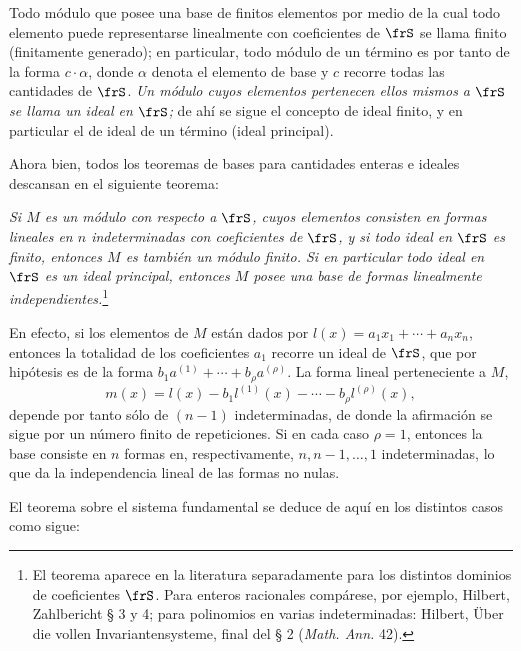 \documentclass[11pt]{article}
\begin{document}
Todo módulo que posee una base de finitos elementos por medio de la cual todo elemento puede representarse linealmente con coeficientes de \(\frS\) se llama finito (finitamente generado); en particular, todo módulo de un término es por tanto de la forma \(c\cdot\alpha\), donde \(\alpha\) denota el elemento de base y \(c\) recorre todas las cantidades de \(\frS\). \emph{Un módulo cuyos elementos pertenecen ellos mismos a \(\frS\) se llama un ideal en \(\frS\);} de ahí se sigue el concepto de ideal finito, y en particular el de ideal de un término (ideal principal).

Ahora bien, todos los teoremas de bases para cantidades enteras e ideales descansan en el siguiente teorema:

\emph{Si \(M\) es un módulo con respecto a \(\frS\), cuyos elementos consisten en formas lineales en \(n\) indeterminadas con coeficientes de \(\frS\), y si todo ideal en \(\frS\) es finito, entonces \(M\) es también un módulo finito. Si en particular todo ideal en \(\frS\) es un ideal principal, entonces \(M\) posee una base de formas linealmente independientes.}\footnote{El teorema aparece en la literatura separadamente para los distintos dominios de coeficientes \(\frS\). Para enteros racionales compárese, por ejemplo, Hilbert, Zahlbericht § 3 y 4; para polinomios en varias indeterminadas: Hilbert, Über die vollen Invariantensysteme, final del § 2 (\emph{Math. Ann.} 42).}

En efecto, si los elementos de \(M\) están dados por \(l(x)=a_1x_1+\cdots+a_nx_n\), entonces la totalidad de los coeficientes \(a_1\) recorre un ideal de \(\frS\), que por hipótesis es de la forma \(b_1a^{(1)}+\cdots+b_\rho a^{(\rho)}\). La forma lineal perteneciente a \(M\),
\[
m(x)=l(x)-b_1l^{(1)}(x)-\cdots-b_\rho l^{(\rho)}(x),
\]
depende por tanto sólo de \((n-1)\) indeterminadas, de donde la afirmación se sigue por un número finito de repeticiones. Si en cada caso \(\rho=1\), entonces la base consiste en \(n\) formas en, respectivamente, \(n,n-1,\ldots,1\) indeterminadas, lo que da la independencia lineal de las formas no nulas.

El teorema sobre el sistema fundamental se deduce de aquí en los distintos casos como sigue:
\end{document}
